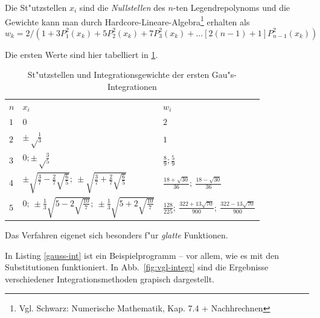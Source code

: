 \documentclass[a4paper]{book}
\begin{document}
Die St"utzstellen $x_i$ sind die \emph{Nullstellen} des $n$-ten
Legendrepolynoms und die Gewichte kann man durch
Hardcore-Lineare-Algebra\footnote{Vgl. Schwarz: Numerische Mathematik,
Kap. 7.4 + Nachhrechnen} erhalten als
\begin{equation}
  \label{eq:68}
  w_k = 2/\left ( 1 + 3P_1^2(x_k) + 5P_2^2(x_k) + 7 P_3^2(x_k) + ... [
 2(n-1)+1] P_{n-1}^2(x_k) \right )
\end{equation}

Die ersten Werte sind hier tabelliert in \ref{tab:gauss-legendere-int}.
\begin{table}
  \centering
  \begin{tabular}{l l l}
    $n$ & $x_i$ & $w_i$ \\
    $1$ & $0$ & $2$ \\
    $2$ & $\pm \sqrt\frac{1}{3}$ & $1$ \\
    $3$ & $0; \pm\sqrt\frac{3}{5}$ & $\frac{8}{9}; \frac{5}{9}$ \\
    $4$ & $\pm\sqrt{ \tfrac{3}{7} - \tfrac{2}{7}\sqrt{\tfrac{6}{5}} };
    ~ \pm\sqrt{ \tfrac{3}{7} + \tfrac{2}{7}\sqrt{\tfrac{6}{5}} }$
    & $\tfrac{18+\sqrt{30}}{36}; ~ \tfrac{18-\sqrt{30}}{36}$ \\
    $5$ & $0; ~ \pm\tfrac13\sqrt{5-2\sqrt{\tfrac{10}{7}}}; ~ \pm\tfrac13\sqrt{5+2\sqrt{\tfrac{10}{7}}}$ 
    & $ \frac{128}{225}; ~ \tfrac{322+13\sqrt{70}}{900}; ~ \tfrac{322-13\sqrt{70}}{900}$
  \end{tabular}
  \caption{St"utzstellen und Integrationsgewichte der ersten Gau"s-Integrationen}
  \label{tab:gauss-legendere-int}
\end{table}

Das Verfahren eigenet sich besonders f"ur \emph{glatte} Funktionen.

In Listing \ref{gauss-int} ist ein Beispielprogramm -- vor allem, wie
es mit den Substitutionen funktioniert. In Abb.~\ref{fig:vgl-integr}
sind die Ergebnisse verschiedener Integrationsmethoden grapisch dargestellt.

 
\end{document}
